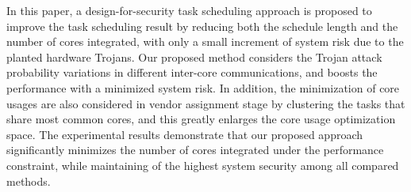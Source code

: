 \documentclass[10pt,journal]{IEEEtran}
\begin{document}
In this paper, a design-for-security task scheduling approach is proposed to improve the task scheduling result by reducing both the schedule length and the number of cores integrated, with only a small increment of system risk due to the planted hardware Trojans. Our proposed method considers the Trojan attack probability variations in different inter-core communications, and boosts the performance with a minimized system risk. In addition, the minimization of core usages are also considered in vendor assignment stage by clustering the tasks that share most common cores, and this greatly enlarges the core usage optimization space. The experimental results demonstrate that our proposed approach significantly minimizes the number of cores integrated under the performance constraint, while maintaining of the highest system security among all compared methods.



\end{document}
